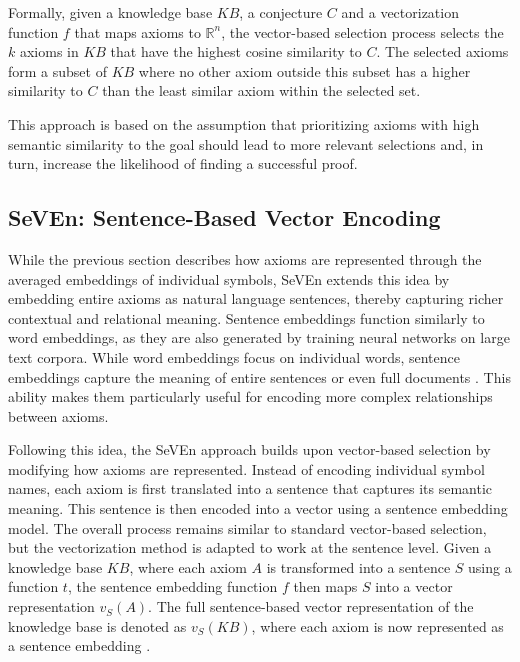 \documentclass[english,version-2020-11]{uzl-thesis}
\begin{document}
Formally, given a knowledge base \( KB \), a conjecture \( C \) and a vectorization function \( f \) that maps axioms to \( \mathbb{R}^n \), the vector-based selection process selects the \( k \) axioms in \( KB \) that have the highest cosine similarity to \( C \). The selected axioms form a subset of \( KB \) where no other axiom outside this subset has a higher similarity to \( C \) than the least similar axiom within the selected set.

This approach is based on the assumption that prioritizing axioms with high semantic similarity to the goal should lead to more relevant selections and, in turn, increase the likelihood of finding a successful proof.


\subsection{SeVEn: Sentence-Based Vector Encoding}

While the previous section describes how axioms are represented through the averaged embeddings of individual symbols, SeVEn extends this idea by embedding entire axioms as natural language sentences, thereby capturing richer contextual and relational meaning. Sentence embeddings function similarly to word embeddings, as they are also generated by training neural networks on large text corpora. While word embeddings focus on individual words, sentence embeddings capture the meaning of entire sentences or even full documents \cite{Kiros2015SkipThought}. This ability makes them particularly useful for encoding more complex relationships between axioms.

Following this idea, the SeVEn approach builds upon vector-based selection by modifying how axioms are represented. Instead of encoding individual symbol names, each axiom is first translated into a sentence that captures its semantic meaning. This sentence is then encoded into a vector using a sentence embedding model. The overall process remains similar to standard vector-based selection, but the vectorization method is adapted to work at the sentence level. Given a knowledge base \( KB \), where each axiom \( A \) is transformed into a sentence \( S \) using a function \( t \), the sentence embedding function \( f \) then maps \( S \) into a vector representation \( v_S(A) \). The full sentence-based vector representation of the knowledge base is denoted as \( v_S(KB) \), where each axiom is now represented as a sentence embedding \cite{Schon2024}.
\end{document}
